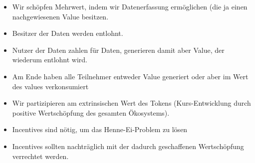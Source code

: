 \vspace{0.3cm}

\begin{Fazit}

\begin{itemize}
  \item Wir schöpfen Mehrwert, indem wir Datenerfassung ermöglichen (die ja einen nachgewiesenen Value besitzen. 
  \item Besitzer der Daten werden entlohnt.
  \item Nutzer der Daten zahlen für Daten, generieren damit aber Value, der wiederum entlohnt wird.
  \item Am Ende haben alle Teilnehmer entweder Value generiert oder aber im Wert des values verkonsumiert
  \item Wir partizipieren am extrinsischen Wert des Tokens (Kurs-Entwicklung durch positive Wertschöpfung des gesamten Ökosystems).
  \item Incentives sind nötig, um das Henne-Ei-Problem zu lösen
  \item Incentives sollten nachträglich mit der dadurch geschaffenen Wertschöpfung verrechtet werden. 
\end{itemize}

\end{Fazit}

\vspace{0.3cm}

